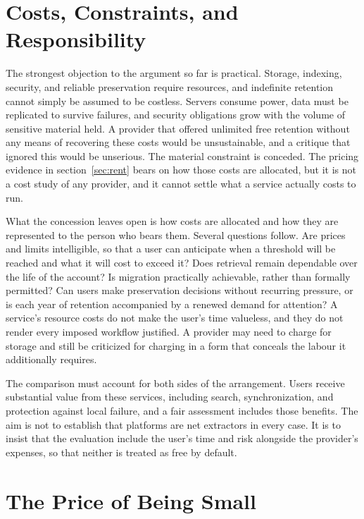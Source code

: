 \documentclass[12pt]{article}
\begin{document}
\section{Costs, Constraints, and Responsibility}

The strongest objection to the argument so far is practical. Storage, indexing, security, and reliable preservation require resources, and indefinite retention cannot simply be assumed to be costless. Servers consume power, data must be replicated to survive failures, and security obligations grow with the volume of sensitive material held. A provider that offered unlimited free retention without any means of recovering these costs would be unsustainable, and a critique that ignored this would be unserious. The material constraint is conceded. The pricing evidence in section~\ref{sec:rent} bears on how those costs are allocated, but it is not a cost study of any provider, and it cannot settle what a service actually costs to run.

What the concession leaves open is how costs are allocated and how they are represented to the person who bears them. Several questions follow. Are prices and limits intelligible, so that a user can anticipate when a threshold will be reached and what it will cost to exceed it? Does retrieval remain dependable over the life of the account? Is migration practically achievable, rather than formally permitted? Can users make preservation decisions without recurring pressure, or is each year of retention accompanied by a renewed demand for attention? A service's resource costs do not make the user's time valueless, and they do not render every imposed workflow justified. A provider may need to charge for storage and still be criticized for charging in a form that conceals the labour it additionally requires.

The comparison must account for both sides of the arrangement. Users receive substantial value from these services, including search, synchronization, and protection against local failure, and a fair assessment includes those benefits. The aim is not to establish that platforms are net extractors in every case. It is to insist that the evaluation include the user's time and risk alongside the provider's expenses, so that neither is treated as free by default.

\section{The Price of Being Small}
\end{document}
